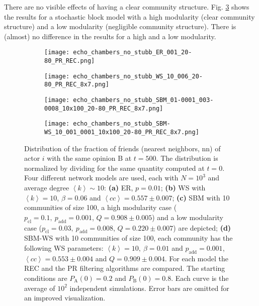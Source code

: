 \documentclass[11 pt , letterpaper , twoside , openright]{book}
\begin{document}
\newline
There are no visible effects of having a clear community structure. Fig. \ref{sbm} shows the results for a stochastic block model with a high modularity (clear community structure) and a low modularity (negligible community structure). There is (almost) no difference in the results for a high and a low modularity.
\newpage
\begin{figure}[H]
  \begin{subfigure}[b]{0.49\textwidth}
    \caption{}
  	\texttt{[image: echo\_chambers\_no\_stubb\_ER\_001\_20-80\_PR\_REC.png]}
    \label{er_echo_20-80}
  \end{subfigure}
  \begin{subfigure}[b]{0.49\textwidth}
    \caption{}
  	\texttt{[image: echo\_chambers\_no\_stubb\_WS\_10\_006\_20-80\_PR\_REC\_8x7.png]}
    \label{ws}
  \end{subfigure}
  \begin{subfigure}[b]{0.49\textwidth}
    \caption{}
    \texttt{[image: echo\_chambers\_no\_stubb\_SBM\_01-0001\_003-0008\_10x100\_20-80\_PR\_REC\_8x7.png]}
  	\label{sbm}    
  \end{subfigure}
  \begin{subfigure}[b]{0.49\textwidth}
    \caption{}
    \texttt{[image: echo\_chambers\_no\_stubb\_SBM-WS\_10\_001\_0001\_10x100\_20-80\_PR\_REC\_8x7.png]}
    \label{sbm-ws}
  \end{subfigure}
  \captionsetup{format=plain}
  \caption[Distribution of the fraction of friends (nearest neighbors, nn) of actor $i$ with the same opinion B at $t=500$, $\left<P_\text{B}^{\text{nn}}\right>$, for an initial $20/80$ opinion distribution.]{Distribution of the fraction of friends (nearest neighbors, nn) of actor $i$ with the same opinion B at $t = 500$. The distribution is normalized by dividing for the same quantity computed at $t=0$. Four different network models are used, each with $N = 10^3$ and average degree $\left<k\right> \sim 10$: \textbf{(a)} ER, $p=0.01$; \textbf{(b)} WS with $\left<k\right> = 10$, $\beta = 0.06$ and $\left<cc\right> = 0.557 \pm 0.007$; \textbf{(c)} SBM with 10 communities of size 100, a high modularity case ($p_{\text{cl}} = 0.1,\ p_{\text{add}} = 0.001$, $Q = 0.908 \pm 0.005$) and a low modularity case ($p_{\text{cl}} = 0.03,\ p_{\text{add}} = 0.008$, $Q = 0.220 \pm 0.007$) are depicted; \textbf{(d)} SBM-WS with 10 communities of size 100, each community has the following WS parameters: $\left<k\right> = 10,\ \beta = 0.01$ and $p_{\text{add}} = 0.001$, $\left<cc\right> = 0.553 \pm 0.004$ and $Q = 0.909 \pm 0.004$. For each model the REC and the PR filtering algorithms are compared. The starting conditions are $P_\text{A}(0) = 0.2$ and $P_\text{B}(0) = 0.8$. Each curve is the average of $10^2$ independent simulations. Error bars are omitted for an improved visualization.}
\label{echo_20_80}
\end{figure}
\end{document}
